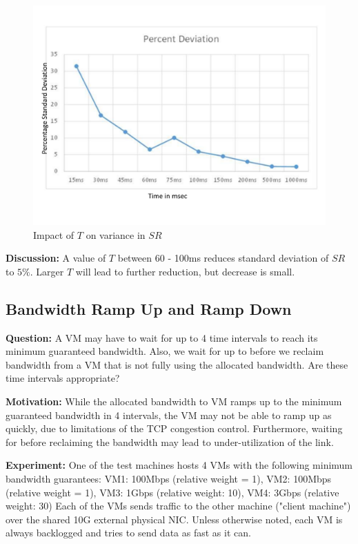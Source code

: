 \begin{figure}
\centering
\includegraphics[width=\columnwidth, trim=60pt 20mm 0pt 8mm]{figures/variation}
\caption{Impact of $T$ on variance in $SR$}
\label{variation}
\vspace{-3mm}
\end{figure}

{\bf Discussion:} A value of $T$ between 60 - 100ms reduces standard deviation
of $SR$ to $5\%$.  Larger $T$ will lead to further reduction, but decrease is
small.

\subsection{Bandwidth Ramp Up and Ramp Down}
{\bf Question:} A VM may have to wait for up to 4 time intervals to reach its
minimum guaranteed bandwidth. Also, we wait for up to  before we
reclaim bandwidth from a VM that is not fully using the allocated bandwidth. Are
these time intervals appropriate?

{\bf Motivation:}  While the allocated bandwidth to VM ramps up to the minimum
guaranteed bandwidth in 4 intervals, the VM may not be able to ramp up as
quickly, due to limitations of the TCP congestion control. Furthermore, waiting
for  before reclaiming the bandwidth may lead to
under-utilization of the link.

{\bf Experiment:}  One of the test machines hosts 4 VMs with the following
minimum bandwidth guarantees: VM1: 100Mbps (relative weight = 1), VM2: 100Mbps
(relative weight = 1), VM3: 1Gbps (relative weight: 10), VM4: 3Gbps (relative
weight: 30) Each of the VMs sends traffic to the other machine ("client
machine") over the shared 10G external physical NIC.  Unless otherwise noted,
each VM is always backlogged and tries to send data as fast as it can.

